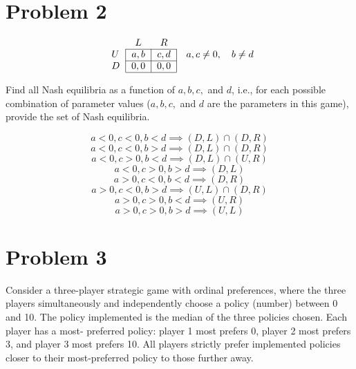 \documentclass[11pt]{article}
\begin{document}
\section*{Problem 2}
\begin{problem}

\[
\begin{tabular}{lcc}
& $L$ & $R$ \\
\cline{2-3}
$U$ & \multicolumn{1}{|c}{$a,b$} & \multicolumn{1}{|c|}{$c,d$} \\
\cline{2-3}
$D$ & \multicolumn{1}{|c}{$0,0$} & \multicolumn{1}{|c|}{$0,0$} \\
\cline{2-3}
\end{tabular}
 \quad a,c \neq 0, \quad b\neq d\]

Find all Nash equilibria as a function of $a, b, c,$ and $d$, i.e., for each possible combination
of parameter values ($a, b, c,$ and $d$ are the parameters in this game), provide the set of
Nash equilibria.
\begin{solution}
    \[a<0, c<0, b<d \implies (D,L) \cap (D,R)\]
    \[a<0, c<0, b>d \implies (D,L) \cap (D,R)\]
    \[a<0, c>0, b<d \implies (D,L) \cap (U,R)\]
    \[a<0, c>0, b>d \implies (D,L)\]
    \[a>0, c<0, b<d \implies (D,R)\]
    \[a>0, c<0, b>d \implies (U,L) \cap (D,R)\]
    \[a>0, c>0, b<d \implies (U,R)\]
    \[a>0, c>0, b>d \implies (U,L)\]
\end{solution}
\end{problem}
\newpage

\section*{Problem 3}
\begin{problem}
    Consider a three-player strategic game with ordinal preferences, where the three players
simultaneously and independently choose a policy (number) between 0 and 10. The
policy implemented is the median of the three policies chosen. Each player has a most-
preferred policy: player 1 most prefers 0, player 2 most prefers 3, and player 3 most
prefers 10. All players strictly prefer implemented policies closer to their most-preferred
policy to those further away.
\end{problem}
\end{document}

